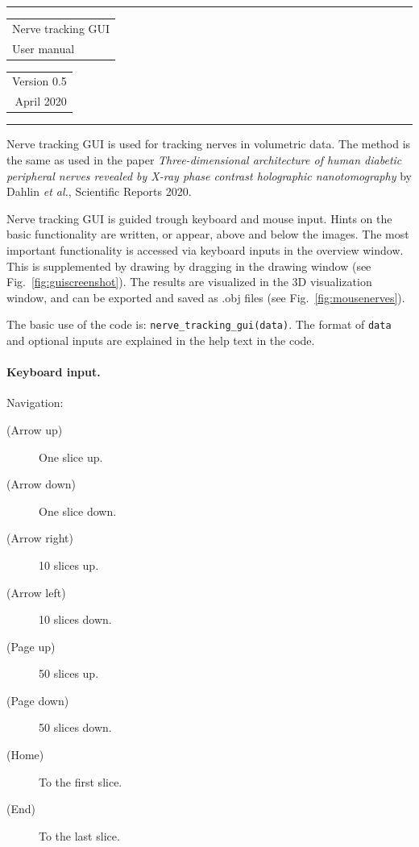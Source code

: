 \documentclass[paper=a4, fontsize=8pt]{article}
\begin{document}
	\begin{large}\hrule height 1pt
		\begin{tabular}{@{}l@{}} Nerve tracking GUI \\ User manual\end{tabular}
		\begin{tabular}{@{}r@{}} Version 0.5 \\ April 2020\end{tabular}\hrule	
	\end{large}\par\vspace{\baselineskip}
	
Nerve tracking GUI is used for tracking nerves in volumetric data. The method is the same as used in the paper \emph{Three-dimensional architecture of human diabetic peripheral nerves revealed by X-ray phase contrast holographic nanotomography} by Dahlin \emph{et al.}, Scientific Reports 2020.

Nerve tracking GUI is guided trough keyboard and mouse input. Hints on the basic functionality are written, or appear, above and below the images. The most important functionality is accessed via keyboard inputs in the overview window. This is supplemented by drawing by dragging in the drawing window (see Fig.~\ref{fig:guiscreenshot}). The results are visualized in the 3D visualization window, and can be exported and saved as .obj files (see Fig.~\ref{fig:mousenerves}).

The basic use of the code is: \texttt{nerve\_tracking\_gui(data)}. The format of \texttt{data} and  optional inputs are explained in the help text in the code.

\paragraph{Keyboard input.} Navigation:
\begin{description}
		\item[(Arrow up)] One slice up.
		\item[(Arrow down)] One slice down.
		\item[(Arrow right)] 10 slices up.
		\item[(Arrow left)] 10 slices down.
		\item[(Page up)] 50 slices up.
		\item[(Page down)] 50 slices down.
		\item[(Home)] To the first slice.
		\item[(End)] To the last slice.
\end{description}
\end{document}
